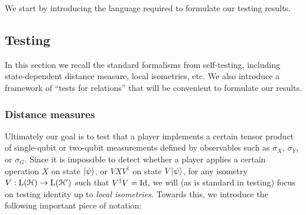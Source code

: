 We start by introducing the language required to formulate our testing results. 


\subsection{Testing}
\label{sec:general-rigidity}
In this section we recall the standard formalisms from self-testing, including state-dependent distance measure, local isometries, etc. We also introduce a framework of ``tests for relations'' that will be convenient to formulate our results. 


\subsubsection{Distance measures}

Ultimately our goal is to test that a player implements a certain tensor product of single-qubit or two-qubit measurements defined by observables such as $\sigma_X$, $\sigma_Y$, or $\sigma_G$. Since it is impossible to detect whether a player applies a certain operation $X$ on state $|\psi\rangle$, or $VXV^\dagger$ on state $V|\psi\rangle$, for any isometry $V:\mathrm{L}(\mathcal{H})\to\mathrm{L}(\mathcal{H}')$ such that $V^\dagger V = \mathop{\rm Id}\nolimits$, we will (as is standard in testing) focus on testing identity up to \emph{local isometries}. Towards this, we introduce the following important piece of notation: 

